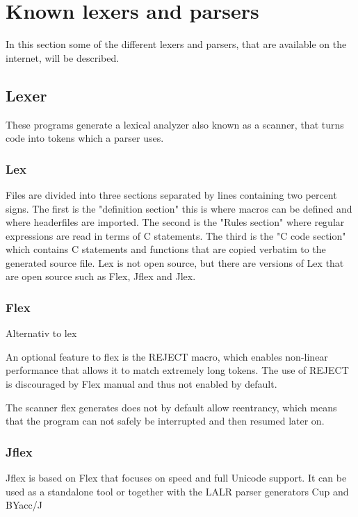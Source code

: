 

\section{Known lexers and parsers}
In this section some of the different lexers and parsers, that are available on the internet, will be described.

\subsection{Lexer}
These programs generate a lexical analyzer also known as a scanner, that turns code into tokens which a parser uses.

\subsubsection{Lex}
Files are divided into three sections separated by lines containing two percent signs. The first is the "definition section" this is where macros can be defined and where headerfiles are imported. The second is the "Rules section" where regular expressions are read in terms of C statements. The third is the "C code section" which contains C statements and functions that are copied verbatim to the generated source file. Lex is not open source, but there are versions of Lex that are open source such as Flex, Jflex and Jlex. \citep{Lex}

\subsubsection{Flex}
Alternativ to lex \citep{Flex}

An optional feature to flex is the REJECT macro, which enables non-linear performance that allows it to match extremely long tokens. The use of REJECT is discouraged by Flex manual and thus not enabled by default. 

The scanner flex generates does not by default allow reentrancy, which means that the program can not safely be interrupted and then resumed later on.

\subsubsection{Jflex}
Jflex is based on Flex that focuses on speed and full Unicode support. It can be used as a standalone tool or together with the LALR parser generators Cup and BYacc/J \citep{Jflex}

